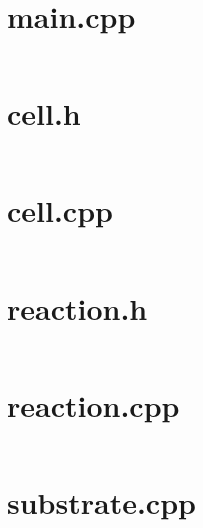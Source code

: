 \documentclass[a4paper,12pt]{article}
\begin{document}
\lstset{basicstyle=\tiny,style=myCustomMatlabStyle}
\begin{appendices}
	\appendix
	
	\section{main.cpp}
	\label{sec:elso_appendix}
\inputminted[fontsize=\scriptsize,linenos,breaklines,breakanywhere,tabsize=2]{c++}{../reading_in/main.cpp}
\section{cell.h}
\label{sec:cell_h}


\inputminted[fontsize=\scriptsize,linenos,breaklines,breakanywhere,tabsize=2]{c++}{../reading_in/cell.h}
\section{cell.cpp}
\label{sec:cell_cpp}


\inputminted[fontsize=\scriptsize,linenos,breaklines,breakanywhere,tabsize=2]{c++}{../reading_in/cell.cpp}
\section{reaction.h}
\label{sec:reaction_h}


\inputminted[fontsize=\scriptsize,linenos,breaklines,breakanywhere,tabsize=2]{c++}{../reading_in/reaction.h}
\section{reaction.cpp}
\label{sec:reaction_cpp}


\inputminted[fontsize=\scriptsize,linenos,breaklines,breakanywhere,tabsize=2]{c++}{../reading_in/reaction.cpp}
\section{substrate.cpp}
\label{sec:substrate_cpp}

\inputminted[fontsize=\scriptsize,linenos,breaklines,breakanywhere,tabsize=2]{c++}{../reading_in/substrate.cpp}
\end{appendices}
\end{document}
